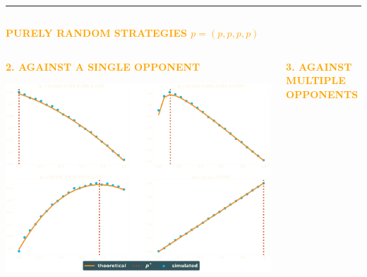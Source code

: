\documentclass[usenames,dvipsnames,t]{beamer}
\begin{document}
\hrule height 3pt
\vspace{1cm}
\begin{columns}
    \begin{column}{.7\linewidth}
        \begin{center}
            \textcolor{orange}{\textbf{\Large{PURELY RANDOM STRATEGIES \(p=(p, p, p, p)\)}}}
        \end{center}

    \begin{columns}
        \begin{column}{.5\linewidth}
            \begin{center}
            \vspace{-1cm}

            \textcolor{orange}{\textbf{\small{2. AGAINST A SINGLE OPPONENT}}}
            \vspace{2cm}

            
            \vspace{2cm}

            \includegraphics[width=.7\textwidth]{static/matches}
            \end{center}
        \end{column}
        \begin{column}{.5\linewidth}
            \begin{center}
                \vspace{-1cm}
    
                \textcolor{orange}{\textbf{\small{3. AGAINST MULTIPLE OPPONENTS}}}
                \vspace{2cm}
    
                
                \vspace{2cm}
    

\end{center}
\end{column}
\end{columns}
\end{column}
\end{columns}
\end{document}
